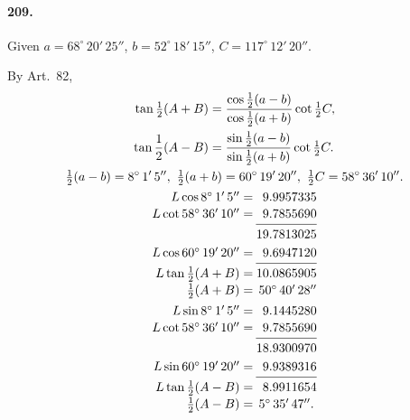 \documentclass{book}[2004/02/16]
\begin{document}
\begin{mainmatter}
\begin{spacing}{1.3}
\paragraph{209.} Given
$a =  68^\circ\, 20'\, 25''$,
$b =  52^\circ\, 18'\, 15''$,
$C = 117^\circ\, 12'\, 20''$.

By Art.\ 82,
\begin{gather*}
\begin{aligned}
  \tan\tfrac12 (A + B)
&= \dfrac{\cos\tfrac12 (a - b)}{\cos\tfrac12 (a + b)}\cot\tfrac12 C,\\
  \tan\dfrac12 (A - B)
&= \dfrac{\sin\tfrac12 (a - b)}{\sin\tfrac12 (a + b)}\cot\tfrac12 C.
\end{aligned}\\
  \tfrac12(a - b) =  8^\circ\,  1'\,  5'',\
  \tfrac12(a + b) = 60^\circ\, 19'\, 20'',\
  \tfrac12C       = 58^\circ\, 36'\, 10''.
\\
\begin{array}{r@{\:}r}
  L\cos  8^\circ\,  1'\, 5''  =& \phantom{1} 9.9957335  \\[.3ex]
  L\cot 58^\circ\, 36'\, 10'' =& \phantom{1} 9.7855690  \\[-1.5ex]
&\hrulefill\\[-.3ex]
                                  &            19.7813025  \\[.6ex]
  L\cos 60^\circ\, 19'\, 20'' =& \phantom{1} 9.6947120  \\[-1.5ex]
&\hrulefill\\[-.3ex]
  L\tan\tfrac12 (A + B) =& 10.0865905  \\[.3ex]
       \tfrac12 (A + B) =&\multicolumn{1}{@{\:}l}{ 50^\circ\, 40'\, 28''}\\[1ex]
  L\sin  8^\circ\,  1'\,  5'' =& \phantom{1} 9.1445280  \\[.3ex]
  L\cot 58^\circ\, 36'\, 10'' =& \phantom{1} 9.7855690  \\[-1.5ex]
&\hrulefill\\[-.3ex]
                                  &            18.9300970  \\[.6ex]
  L\sin 60^\circ\, 19'\, 20'' =& \phantom{1} 9.9389316  \\[-1.5ex]
&\hrulefill\\[-.3ex]
  L\tan\tfrac12 (A - B) =& \phantom{1} 8.9911654\\[.3ex]
\tfrac12 (A - B) =& \multicolumn{1}{@{\:}l}{ 5^\circ\, 35'\, 47''.}
\end{array}
\end{gather*}


\end{spacing}
\end{mainmatter}
\end{document}
